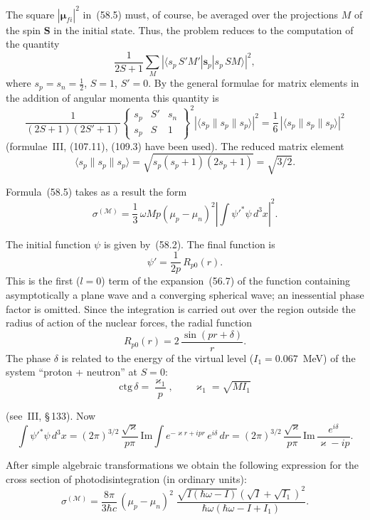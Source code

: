 The square $|\boldsymbol{\mu}_{fi}|^2$ in~(58.5) must, of course, be averaged over the projections $M$ of the spin $\mathbf{S}$ in the initial state. Thus, the problem reduces to the computation of the quantity
\[
\frac{1}{2S+1}\sum_M|\langle s_p\,S'M'|\mathbf{s}_p|s_p\,SM\rangle|^2,
\]
where $s_p = s_n = \tfrac{1}{2}$, $S = 1$, $S' = 0$. By the general formulae for matrix elements in the addition of angular momenta this quantity is
\[
\frac{1}{(2S+1)(2S'+1)}\begin{Bmatrix} s_p & S' & s_n \\ s_p & S & 1\end{Bmatrix}^{\!2}|\langle s_p\|s_p\|s_p\rangle|^2 = \frac{1}{6}\,|\langle s_p\|s_p\|s_p\rangle|^2
\]
(formulae~III, (107.11), (109.3) have been used). The reduced matrix element
\[
\langle s_p\|s_p\|s_p\rangle = \sqrt{s_p(s_p+1)(2s_p+1)} = \sqrt{3/2}.
\]

Formula~(58.5) takes as a result the form
\begin{equation}
\sigma^{(\mathscr{M})} = \frac{1}{3}\,\omega Mp(\mu_p - \mu_n)^2\left|\int\psi'^*\psi\,d^3x\right|^2.
\tag{58.6}
\end{equation}

The initial function $\psi$ is given by~(58.2). The final function is
\[
\psi' = \frac{1}{2p}\,R_{p0}(r).
\]
This is the first ($l = 0$) term of the expansion~(56.7) of the function containing asymptotically a plane wave and a converging spherical wave; an inessential phase factor is omitted. Since the integration is carried out over the region outside the radius of action of the nuclear forces, the radial function
\[
R_{p0}(r) = 2\,\frac{\sin(pr + \delta)}{r}.
\]
The phase $\delta$ is related to the energy of the virtual level ($I_1 = 0.067$~MeV) of the system ``proton + neutron'' at $S = 0$:
\[
\mathrm{ctg}\,\delta = \frac{\varkappa_1}{p},\qquad \varkappa_1 = \sqrt{MI_1}
\]

(see~III, \S\,133). Now
\[
\int\psi'^*\psi\,d^3x = (2\pi)^{3/2}\,\frac{\sqrt{\varkappa}}{p\pi}\,\mathrm{Im}\int e^{-\varkappa r + ipr}\,e^{i\delta}\,dr = (2\pi)^{3/2}\,\frac{\sqrt{\varkappa}}{p\pi}\,\mathrm{Im}\,\frac{e^{i\delta}}{\varkappa - ip}.
\]

After simple algebraic transformations we obtain the following expression for the cross section of photodisintegration (in ordinary units):
\begin{equation}
\sigma^{(\mathscr{M})} = \frac{8\pi}{3\hbar c}\,(\mu_p - \mu_n)^2\;\frac{\sqrt{I(\hbar\omega - I)}(\sqrt{I} + \sqrt{I_1})^2}{\hbar\omega(\hbar\omega - I + I_1)}.
\tag{58.7}
\end{equation}

